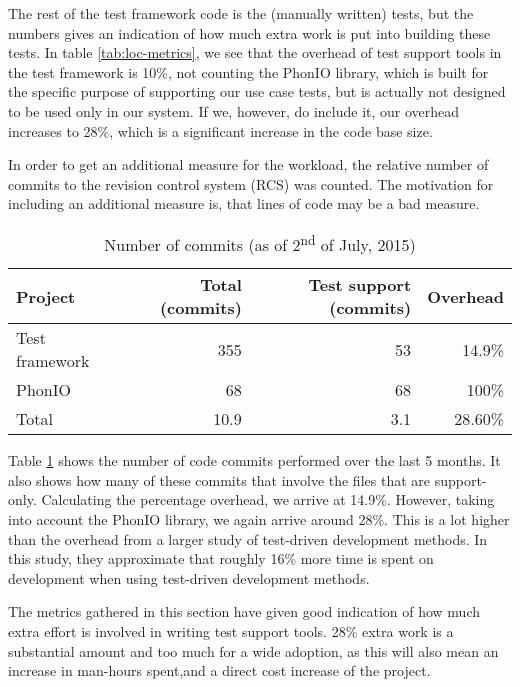\noindent The rest of the test framework code is the (manually written) tests, but the numbers gives an indication of how much extra work is put into building these tests. In table \ref{tab:loc-metrics}, we see that the overhead of test support tools in the test framework is 10\%, not counting the PhonIO library, which is built for the specific purpose of supporting our use case tests, but is actually not designed to be used only in our system. If we, however, do include it, our overhead increases to 28\%, which is a significant increase in the code base size.\medskip

\noindent In order to get an additional measure for the workload, the relative number of commits to the revision control system (RCS) was counted. The motivation for including an additional measure is, that lines of code may be a bad measure\cite{fraser2013does}.\medskip

\begin{table}[!htbp]
\centering
\begin{tabular}{ | l | r | r | r |}
   \hline
   Project        & Total (commits) & Test support (commits) & Overhead \\ \hline
   Test framework & 355             & 53                     & 14.9\%   \\
   PhonIO         & 68              & 68                     & 100\%    \\
   \hline
   Total          & 10.9            & 3.1                    & 28.60\%  \\
   \hline
   
\end{tabular}
\caption{Number of commits (as of 2\textsuperscript{nd} of July, 2015)}
\label{tab:metrics-commit-count}
\end{table}

\noindent Table \ref{tab:metrics-commit-count} shows the number of code commits performed over the last 5 months. It also shows how many of these commits that involve the files that are support-only. Calculating the percentage overhead, we arrive at 14.9\%. However, taking into account the PhonIO library, we again arrive around 28\%. This is a lot higher than the overhead from a larger study of test-driven development methods\cite{george2003}. In this study, they approximate that roughly 16\% more time is spent on development when using test-driven development methods.\bigskip

\noindent The metrics gathered in this section have given good indication of how much extra effort is involved in writing test support tools. 28\% extra work is a substantial amount and too much for a wide adoption, as this will also mean an increase in man-hours spent,and a direct cost increase of the project.\medskip

